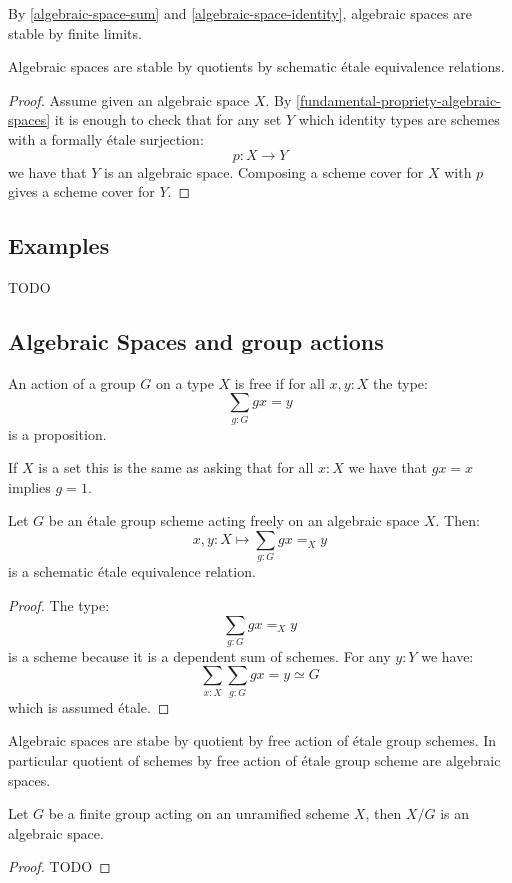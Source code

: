 By \cref{algebraic-space-sum} and \cref{algebraic-space-identity}, algebraic spaces are stable by finite limits.

\begin{lemma}
Algebraic spaces are stable by quotients by schematic étale equivalence relations.
\end{lemma}

\begin{proof}
Assume given an algebraic space $X$. By \cref{fundamental-propriety-algebraic-spaces} it is enough to check that for any set $Y$ which identity types are schemes with a formally étale surjection:
\[p:X\to Y\]
we have that $Y$ is an algebraic space. Composing a scheme cover for $X$ with $p$ gives a scheme cover for $Y$.
\end{proof}

\subsection{Examples}

TODO

\subsection{Algebraic Spaces and group actions}

\begin{definition}
An action of a group $G$ on a type $X$ is free if for all $x,y:X$ the type:
\[\sum_{g:G}gx=y\]
 is a proposition.
\end{definition}

If $X$ is a set this is the same as asking that for all $x:X$ we have that $gx=x$ implies $g=1$.

\begin{lemma}
Let $G$ be an étale group scheme acting freely on an algebraic space $X$. Then:
\[x,y:X \mapsto \sum_{g:G}gx=_Xy\]
is a schematic étale equivalence relation.
\end{lemma}

\begin{proof}
The type:
\[\sum_{g:G}gx=_Xy\]
is a scheme because it is a dependent sum of schemes. For any $y:Y$ we have:
\[\sum_{x:X}\sum_{g:G}gx=y \simeq G\]
which is assumed étale.
\end{proof}

\begin{corollary}
Algebraic spaces are stabe by quotient by free action of étale group schemes. In particular quotient of schemes by free action of étale group scheme are algebraic spaces.
\end{corollary}

\begin{lemma}
Let $G$ be a finite group acting on an unramified scheme $X$, then $X/G$ is an algebraic space.
\end{lemma}

\begin{proof}
TODO
\end{proof}
